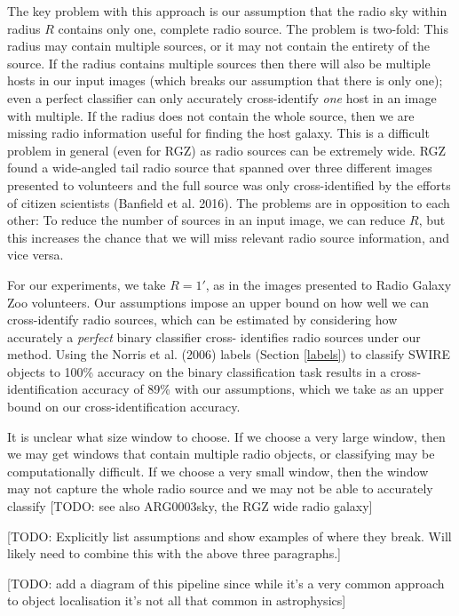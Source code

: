 \documentclass[fleqn,usenatbib,usedcolumn]{mnras}
\begin{document}
    The key problem with this approach is our assumption that the radio sky
    within radius \(R\) contains only one, complete radio source. The
    problem is two-fold: This radius may contain multiple sources, or it may
    not contain the entirety of the source. If the radius contains multiple
    sources then there will also be multiple hosts in our input images
    (which breaks our assumption that there is only one); even a perfect
    classifier can only accurately cross-identify \emph{one} host in an
    image with multiple. If the radius does not contain the whole source,
    then we are missing radio information useful for finding the host
    galaxy. This is a difficult problem in general (even for RGZ) as radio
    sources can be extremely wide. RGZ found a wide-angled tail radio source
    that spanned over three different images presented to volunteers and the
    full source was only cross-identified by the efforts of citizen
    scientists (Banfield et al. 2016). The problems are in opposition to
    each other: To reduce the number of sources in an input image, we can
    reduce \(R\), but this increases the chance that we will miss relevant
    radio source information, and vice versa.

    For our experiments, we take \(R = 1'\), as in the images presented to
    Radio Galaxy Zoo volunteers. Our assumptions impose an upper bound on how
    well we can cross-identify radio sources, which can be estimated by
    considering how accurately a \emph{perfect} binary classifier cross-
    identifies radio sources under our method. Using the Norris et al. (2006)
    labels (Section \ref{labels}) to classify SWIRE objects to 100\% accuracy
    on the binary classification task results in a cross-identification
    accuracy of 89\% with our assumptions, which we take as an upper bound on
    our cross-identification accuracy.

    It is unclear what size window to choose. If we choose a very large
    window, then we may get windows that contain multiple radio objects, or
    classifying may be computationally difficult. If we choose a very small
    window, then the window may not capture the whole radio source and we
    may not be able to accurately classify {[}TODO: see also ARG0003sky, the
    RGZ wide radio galaxy{]}

    {[}TODO: Explicitly list assumptions and show examples of where they
    break. Will likely need to combine this with the above three
    paragraphs.{]}

    {[}TODO: add a diagram of this pipeline since while it's a very common
    approach to object localisation it's not all that common in
    astrophysics{]}
\end{document}

